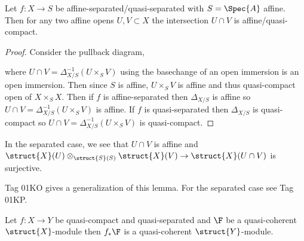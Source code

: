 \documentclass[12pt]{article}
\begin{document}
\begin{lemma}
Let $f : X \to S$ be affine-separated/quasi-separated with $S = \Spec{A}$ affine. Then for any two affine opens $U, V \subset X$ the intersection $U \cap V$ is affine/quasi-compact. 
\end{lemma}

\begin{proof}
Consider the pullback diagram,
\begin{center}
\end{center}
where $U \cap V = \Delta_{X/S}^{-1}(U \times_S V)$ using the basechange of an open immersion is an open immersion. Then since $S$ is affine, $U \times_S V$ is affine and thus quasi-compact open of $X \times_S X$. Then if $f$ is affine-separated then $\Delta_{X/S}$ is affine so $U \cap V = \Delta_{X/S}^{-1}(U \times_S V)$ is affine. If $f$ is quasi-separated then $\Delta_{X/S}$ is quasi-compact so $U \cap V = \Delta_{X/S}^{-1}(U \times_S V)$ is quasi-compact.
\end{proof}

\begin{rmk}
In the separated case, we see that $U \cap V$ is affine and $\struct{X}(U) \otimes_{\struct{S}(S)} \struct{X}(V) \to \struct{X}(U \cap V)$ is surjective.
\end{rmk}

\begin{rmk}
Tag 01KO gives a generalization of this lemma. For the separated case see Tag 01KP.
\end{rmk}

\begin{lemma}
Let $f : X \to Y$ be quasi-compact and quasi-separated and $\F$ be a quasi-coherent $\struct{X}$-module then $f_* \F$ is a quasi-coherent $\struct{Y}$-module.
\end{lemma}
\end{document}
